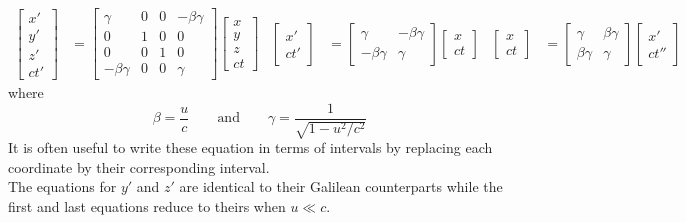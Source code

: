 \documentclass{subfiles}
\begin{document}
		\begin{align*}
			\begin{bmatrix}
				x' \\
				y' \\
				z' \\
				ct'
			\end{bmatrix} &=
					\begin{bmatrix}
						\gamma & 0 & 0 & -\beta\gamma \\
						0 & 1 & 0 & 0 \\
						0 & 0 & 1 & 0 \\
						-\beta\gamma & 0 & 0 & \gamma
					\end{bmatrix}
					\begin{bmatrix}
						x \\
						y \\
						z \\ 
						ct
					\end{bmatrix} &
				\begin{bmatrix}
					x' \\
					ct'
				\end{bmatrix} &=
					\begin{bmatrix}
						\gamma & -\beta\gamma \\
						-\beta\gamma & \gamma
					\end{bmatrix}
					\begin{bmatrix}
						x \\
						ct
					\end{bmatrix} &
				\begin{bmatrix}
					x \\
					ct
				\end{bmatrix} &=
					\begin{bmatrix}
						\gamma & \beta\gamma \\
						\beta\gamma & \gamma
					\end{bmatrix}
					\begin{bmatrix}
						x' \\
						ct''
					\end{bmatrix}
		\end{align*}
		where
		\[
			\beta = \frac{u}{c} \qquad \text{and} \qquad
				\gamma = \frac{1}{\sqrt{1 - u^2/c^2}}
		\]
		It is often useful to write these equation in terms of intervals by replacing each coordinate by their corresponding interval. \\
		The equations for \(y'\) and \(z'\) are identical to their Galilean counterparts while the first and last equations reduce to theirs when \(u \ll c\). \\
\end{document}
